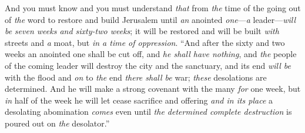 \begin{biblechapter}
\verse And you must know and you must understand \textit{that} from \textit{the} time of the going out of \textit{the} word to restore and build Jerusalem until \textit{an} anointed \textit{one}—\textit{a} leader—\textit{will be} \textit{seven weeks and sixty-two weeks}; it will be restored and will be built \textit{with} streets and \textit{a} moat, but \textit{in a time of oppression}.
\verse “And after the sixty and two weeks an anointed one shall be cut off, and \textit{he shall have nothing}, and \textit{the} people of the coming leader will destroy the city and the sanctuary, and its end \textit{will be} with the flood and \textit{on} to \textit{the} end \textit{there shall be} war; \textit{these} desolations are determined.
\verse And he will make a strong covenant with the many \textit{for} one week, but \textit{in} half of the week he will let cease sacrifice and offering \textit{and in its place} a desolating abomination \textit{comes} even until \textit{the determined complete destruction} is poured out on \textit{the} desolator.”
\end{biblechapter}

